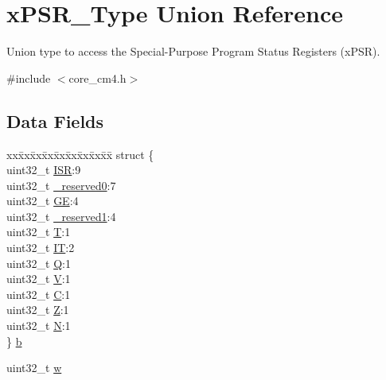 \hypertarget{unionx_p_s_r___type}{}\section{x\+P\+S\+R\+\_\+\+Type Union Reference}
\label{unionx_p_s_r___type}


Union type to access the Special-\/\+Purpose Program Status Registers (x\+P\+SR).  




{\ttfamily \#include $<$core\+\_\+cm4.\+h$>$}

\subsection*{Data Fields}
\begin{DoxyCompactItemize}
\item 
\begin{tabbing}
xx\=xx\=xx\=xx\=xx\=xx\=xx\=xx\=xx\=\kill
struct \{\\
\>uint32\_t \hyperlink{unionx_p_s_r___type_ad502ba7dbb2aab5f87c782b28f02622d}{ISR}:9\\
\>uint32\_t \hyperlink{unionx_p_s_r___type_ac8a6a13838a897c8d0b8bc991bbaf7c1}{\_reserved0}:7\\
\>uint32\_t \hyperlink{unionx_p_s_r___type_aa91800ec6e90e457c7a1acd1f2e17099}{GE}:4\\
\>uint32\_t \hyperlink{unionx_p_s_r___type_a959a73d8faee56599b7e792a7c5a2d16}{\_reserved1}:4\\
\>uint32\_t \hyperlink{unionx_p_s_r___type_a6e1cf12e53a20224f6f62c001d9be972}{T}:1\\
\>uint32\_t \hyperlink{unionx_p_s_r___type_a76485660fe8ad98cdc71ddd7cb0ed777}{IT}:2\\
\>uint32\_t \hyperlink{unionx_p_s_r___type_a65f27ddc4f7e09c14ce7c5211b2e000a}{Q}:1\\
\>uint32\_t \hyperlink{unionx_p_s_r___type_acd4a2b64faee91e4a9eef300667fa222}{V}:1\\
\>uint32\_t \hyperlink{unionx_p_s_r___type_a7a1caf92f32fe9ebd8d1fe89b06c7776}{C}:1\\
\>uint32\_t \hyperlink{unionx_p_s_r___type_a5ae954cbd9986cd64625d7fa00943c8e}{Z}:1\\
\>uint32\_t \hyperlink{unionx_p_s_r___type_abae0610bc2a97bbf7f689e953e0b451f}{N}:1\\
\} \hyperlink{unionx_p_s_r___type_a8d8c45d946ef8df11f4cac72c667e98b}{b}\\

\end{tabbing}\item 
uint32\+\_\+t \hyperlink{unionx_p_s_r___type_ad0fb62e7a08e70fc5e0a76b67809f84b}{w}
\end{DoxyCompactItemize}


